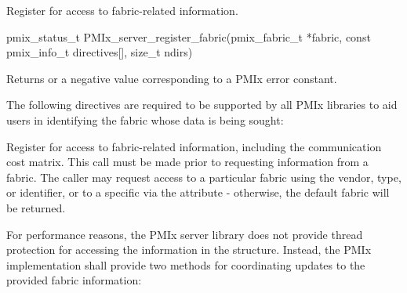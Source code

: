 \summary

Register for access to fabric-related information.

\format

\cspecificstart
\begin{codepar}
pmix_status_t
PMIx_server_register_fabric(pmix_fabric_t *fabric,
                            const pmix_info_t directives[],
                            size_t ndirs)
\end{codepar}
\cspecificend

\begin{arglist}
\end{arglist}

Returns  or a negative value corresponding to a \ac{PMIx} error constant.

\reqattrstart
The following directives are required to be supported by all \ac{PMIx} libraries to aid users in identifying the fabric whose data is being sought:


\reqattrend

\descr

Register for access to fabric-related information, including the communication cost matrix. This call must be made prior to requesting information from a fabric. The caller may request access to a particular fabric using the vendor, type, or identifier, or to a specific  via the  attribute - otherwise, the default fabric will be returned.

For performance reasons, the \ac{PMIx} server library does not provide thread protection for accessing the information in the  structure. Instead, the \ac{PMIx} implementation shall provide two methods for coordinating updates to the provided fabric information:

